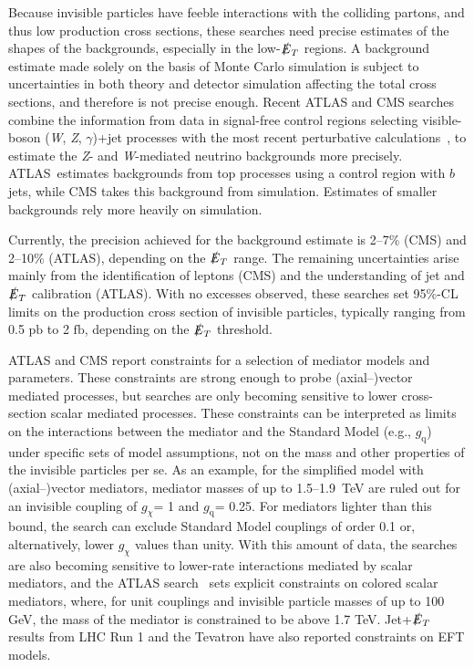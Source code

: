\documentclass{ar-1col}
\newcommand{\chiDM}{\ensuremath{\chi}\xspace}
\newcommand{\IP}{invisible particle}
\newcommand{\gDM}{\ensuremath{g_{\chiDM}}\xspace}
\newcommand{\gdm}{\gDM}
\newcommand{\gq}{$g_{\mathrm{q}}$\xspace}
\newcommand{\MET}{\ensuremath{\slashed{E}_T}\xspace}
\newcommand{\fb}{\ensuremath{\mathrm{fb}}\xspace}
\newcommand{\pb}{\ensuremath{\mathrm{pb}}\xspace}
\begin{document}
{Because {\IP}s have feeble interactions with the colliding
partons, and thus low production cross sections, these searches
need precise estimates of the shapes of the backgrounds, especially in the low-\MET regions.
A background estimate made solely on the basis of Monte Carlo simulation is subject to
uncertainties in both theory and detector simulation affecting the
total cross sections, and therefore is not precise enough. 
Recent ATLAS and CMS searches combine the information from data in signal-free
{control regions} selecting visible-boson (\textit{W},
\textit{Z}, $\gamma$)+jet processes with the most recent perturbative
calculations~\cite{Lindert:2017olm}, to
estimate the \textit{Z}- and \textit{W}-mediated neutrino backgrounds more precisely.
ATLAS\ estimates backgrounds from top processes using a
control region with $b$ jets, while CMS takes this background from
simulation. Estimates of smaller backgrounds rely more heavily on
simulation.

Currently, the precision achieved for the background estimate is 2--7\%
(CMS) and 2--10\% (ATLAS), depending on the \MET range. The
remaining uncertainties arise mainly from the identification of
leptons (CMS) and the understanding of jet and \MET
calibration (ATLAS).
With no excesses observed, these searches set 95\%-CL limits
on the production cross section of {\IP}s, typically ranging from
0.5 \pb to 2 \fb, depending on the \MET threshold. 

ATLAS and CMS report
constraints for a selection of mediator models and parameters. These constraints are strong enough to probe (axial--)vector mediated
processes, but searches are only becoming sensitive to lower cross-section scalar mediated processes. 
 These constraints
can be interpreted as limits on the interactions between the
mediator and the Standard Model (e.g., \gq) under specific sets of model
assumptions, not on the mass and other properties of the {\IP}s
per se. As an example, for the simplified model with
(axial--)vector mediators, mediator masses of up to
1.5--1.9~TeV are ruled out
for an invisible coupling of \gdm = 1 and \gq = 0.25. For mediators lighter than
this bound, the search can exclude Standard Model couplings of order 0.1 or,
alternatively, lower \gdm values than unity. With this amount of
data, the searches are also becoming sensitive to lower-rate
interactions mediated by scalar mediators, and the
ATLAS search~\cite{Aaboud:2017phn} sets explicit constraints on
colored scalar mediators, where, for unit couplings and invisible
particle masses of up to 100 GeV, the mass of the mediator is
constrained to be above 1.7 TeV. Jet+\MET results from LHC Run 1
and the Tevatron have also reported constraints on EFT models.

}
\end{document}

